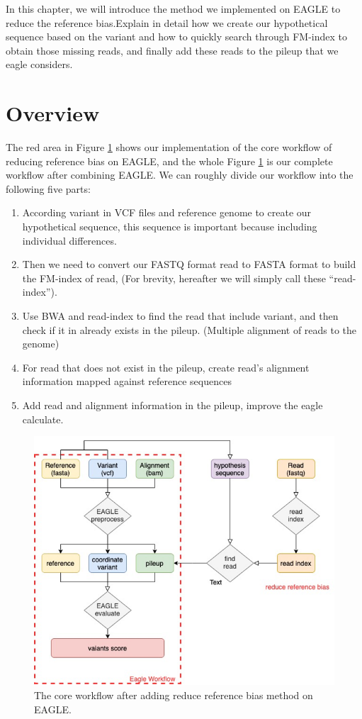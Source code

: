 \hspace{24pt}
In this chapter, we will introduce the method we implemented on EAGLE to reduce the reference bias.Explain in detail how we create our hypothetical sequence based on the variant and how to quickly search through FM-index to obtain those missing reads, and finally add these reads to the pileup that we eagle considers.
\section{Overview}
The red area in Figure \ref{f3-1} shows our implementation of the core workflow of reducing reference bias on EAGLE, and the whole  Figure \ref{f3-1} is our complete workflow after combining EAGLE. 
We can roughly divide our workflow into the following five parts:
\begin{enumerate}
    \item According variant in VCF files and reference genome to create our hypothetical sequence, this sequence is important because including individual differences.
    \item Then we need to convert our FASTQ format read to FASTA format to build the FM-index of read, (For brevity, hereafter we will simply call these “read-index”).
    \item Use BWA and read-index to find the read that include variant, and then check if it in already exists in the pileup. (Multiple alignment of reads to the genome)
    \item For read that does not exist in the pileup, create read’s alignment information mapped against reference sequences
    \item Add read and alignment information in the pileup, improve the eagle calculate.

\end{enumerate}

\begin{figure}[H]
    \centering
    \includegraphics[width=0.8\columnwidth]{body/image/3-1.png}
    \captionsetup{labelfont=bf}
    \renewcommand{\baselinestretch}{1.0}
    \caption[Core workflow]{The core workflow after adding reduce reference bias method on EAGLE.}
    \label{f3-1}
\end{figure}

